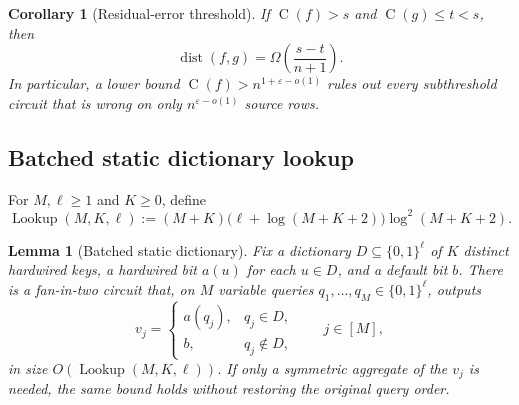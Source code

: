 \documentclass[11pt]{article}
\newtheorem{lemma}[theorem]{Lemma}
\newtheorem{corollary}[theorem]{Corollary}
\theoremstyle{definition}
\newcommand{\bits}{\{0,1\}}
\newcommand{\Ckt}{\operatorname{C}}
\newcommand{\dist}{\operatorname{dist}}
\newcommand{\Lookup}{\operatorname{Lookup}}
\newcommand{\eps}{\varepsilon}
\begin{document}
\begin{corollary}[Residual-error threshold]\label{cor:residual}
If $\Ckt(f)>s$ and $\Ckt(g)\le t<s$, then
\[
  \dist(f,g)=\Omega\!\left(\frac{s-t}{n+1}\right).
\]
In particular, a lower bound $\Ckt(f)>n^{1+\eps-o(1)}$ rules out every subthreshold circuit that is wrong on only $n^{\eps-o(1)}$ source rows.
\end{corollary}

\subsection{Batched static dictionary lookup}

For $M,\ell\ge1$ and $K\ge0$, define
\begin{equation}\label{eq:lookup-def}
  \Lookup(M,K,\ell)
  :=(M+K)\bigl(\ell+\log(M+K+2)\bigr)
     \log^2(M+K+2).
\end{equation}

\begin{lemma}[Batched static dictionary]\label{lem:dictionary}
Fix a dictionary $D\subseteq\bits^\ell$ of $K$ distinct hardwired keys, a hardwired bit $a(u)$ for each $u\in D$, and a default bit $b$.  There is a fan-in-two circuit that, on $M$ variable queries $q_1,\ldots,q_M\in\bits^\ell$, outputs
\[
  v_j=
  \begin{cases}
    a(q_j),&q_j\in D,\\
    b,&q_j\notin D,
  \end{cases}
  \qquad j\in[M],
\]
in size $O(\Lookup(M,K,\ell))$.
If only a symmetric aggregate of the $v_j$ is needed, the same bound holds without restoring the original query order.
\end{lemma}
\end{document}
